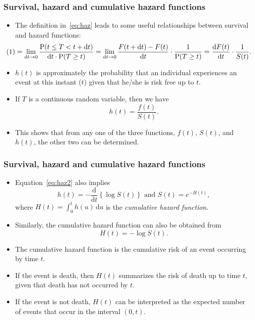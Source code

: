 \documentclass[10pt]{beamer}\usepackage[]{graphicx}\usepackage[]{color}
\newcommand{\dif}{\mathrm{d}}
\newcommand{\dt}{\mathrm{d}t}
\newcommand{\empr}[1]{{\emph{\color{red}#1}}}
\newcommand{\p}{\mathrm{P}}
\begin{document}
\begin{frame}
  \frametitle{Survival, hazard and cumulative hazard functions}
  \begin{itemize}
    \item The definition in~\eqref{eq:haz} leads to some useful relationships between survival and hazard functions:
      \begin{equation*}
        \hspace{-.5cm}
        (1) = \lim_{\dt\to0}\frac{\p(t\le T < t + \dt)}{\dt\cdot\p(T \ge t)} = 
        \lim_{\dt\to0}\frac{F(t + \dt) - F(t)}{\dt} \cdot \frac{1}{\p(T \ge t)} =
        \frac{\dif F(t)}{\dif t}\cdot \frac{1}{S(t)}.
      \end{equation*}
    \item $h(t)$ is approximately the probability that an individual experiences an event at this instant ($t$)
      given that he/she is risk free up to $t$.
    \item If $T$ is a continuous random variable, then we have 
      \begin{equation}
        h(t) = \frac{f(t)}{S(t)}.
        \label{eq:haz2}
      \end{equation}
    \item This shows that from any one of the three functions, $f(t)$, $S(t)$, and $h(t)$, 
      the other two can be determined. 
  \end{itemize}
\end{frame}

\begin{frame}
  \frametitle{Survival, hazard and cumulative hazard functions}
  \begin{itemize}
    \item Equation~\eqref{eq:haz2} also implies
      $$h(t) = -\frac{\dif}{\dif t}\left\{ \log S(t)\right\} \mbox{ and } S(t) = e^{-H(t)},$$
      where $H(t) = \int_0^th(u)\,\dif u$ is the \empr{cumulative hazard function}.
    \item Similarly, the cumulative hazard function can also be obtained from 
      $$H(t) = -\log S(t).$$
    \item The cumulative hazard function is the cumulative risk of an event occurring by time $t$.
    \item If the event is death, then $H(t)$ summarizes the risk of death up to time $t$, given that death has not occurred by $t$.
    \item If the event is not death, $H(t)$ can be interpreted as the expected number of events that occur in the interval $(0, t)$.
  \end{itemize}
\end{frame}
\end{document}
